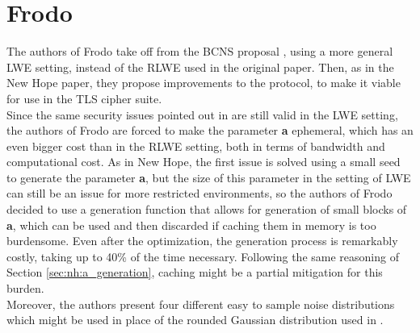 \section{Frodo}\label{sec:fr}
The authors of Frodo \cite{frodo} take off from the BCNS proposal \cite{BCNS}, using a more general LWE setting, instead of the RLWE used in the original paper. Then, as in the New Hope paper, they propose improvements to the protocol, to make it viable for use in the TLS cipher suite.\\
Since the same security issues pointed out in \cite{newhope} are still valid in the LWE setting, the authors of Frodo are forced to make the parameter \textbf{a} ephemeral, which has an even bigger cost than in the RLWE setting, both in terms of bandwidth and computational cost. As in New Hope, the first issue is solved using a small seed to generate the parameter \textbf{a}, but the size of this parameter in the setting of LWE can still be an issue for more restricted environments, so the authors of Frodo decided to use a generation function that allows for generation of small blocks of \textbf{a}, which can be used and then discarded if caching them in memory is too burdensome. Even after the optimization, the generation process is remarkably costly, taking up to 40\% of the time necessary. Following the same reasoning of Section \ref{sec:nh:a_generation}, caching might be a partial mitigation for this burden.\\
Moreover, the authors present four different easy to sample noise distributions which might be used in place of the rounded Gaussian distribution used in \cite{BCNS}.

